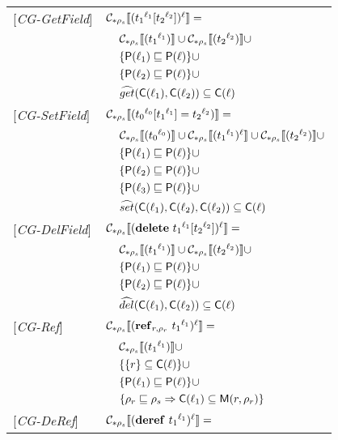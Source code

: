 \documentclass[[12pt,a4paper,twoside,openrigh]{article}
\newcommand{\lbt}[1]{{t_#1}^{\ell_#1}}
\begin{document}
\begin{tabular} {l l l l}
{[\textit{CG-GetField}]}&\multicolumn{3}{l}{$\genl {\lookup {\lbt 1} {\lbt 2}} = $}\\
&&\multicolumn{2}{l}{$ \gen {\lbt1} \cup \gen {\lbt 2} \cup$}\\
&&\multicolumn{2}{l}{$\{ \mathsf{P}(\ell_1) \sqsubseteq \mathsf{P}(\ell) \} \cup$} \\
&&\multicolumn{2}{l}{$\{ \mathsf{P}(\ell_2) \sqsubseteq \mathsf{P}(\ell) \} \cup$} \\
&&\multicolumn{2}{l}{$\widehat{get} (\mathsf{C}(\ell_1), \mathsf{C}(\ell_2)) \subseteq \mathsf{C}(\ell)$} \\
{[\textit{CG-SetField}]}&\multicolumn{3}{l}{$\gen {\store {\lbt 0} {\lbt 1} {\lbt 2}} = $}\\
&&\multicolumn{2}{l}{$ \gen {\lbt 0} \cup \genl {\lbt 1} \cup \gen {\lbt 2} \cup $}\\
&&\multicolumn{2}{l}{$\{ \mathsf{P}(\ell_1) \sqsubseteq \mathsf{P}(\ell) \} \cup$} \\
&&\multicolumn{2}{l}{$\{ \mathsf{P}(\ell_2) \sqsubseteq \mathsf{P}(\ell) \} \cup$} \\
&&\multicolumn{2}{l}{$\{ \mathsf{P}(\ell_3) \sqsubseteq \mathsf{P}(\ell) \} \cup$} \\
&&\multicolumn{2}{l}{$\widehat{set} (\mathsf{C}(\ell_1), \mathsf{C}(\ell_2), \mathsf{C}(\ell_2)) \subseteq \mathsf{C}(\ell)$} \\
{[\textit{CG-DelField}]}&\multicolumn{3}{l}{$\genl {\delete {\lbt 1} {\lbt 2}} = $}\\ 
&&\multicolumn{2}{l}{$ \gen {\lbt1} \cup \gen {\lbt 2} \cup$}\\
&&\multicolumn{2}{l}{$\{ \mathsf{P}(\ell_1) \sqsubseteq \mathsf{P}(\ell) \} \cup$} \\
&&\multicolumn{2}{l}{$\{ \mathsf{P}(\ell_2) \sqsubseteq \mathsf{P}(\ell) \} \cup$} \\
&&\multicolumn{2}{l}{$\widehat{del} (\mathsf{C}(\ell_1), \mathsf{C}(\ell_2)) \subseteq \mathsf{C}(\ell)$}\\
{[\textit{CG-Ref}]}&\multicolumn{3}{l}{$ \genl {\newref {r,\rho_r} {\lbt 1}} = $}\\
&&\multicolumn{2}{l}{$\gen {\lbt 1} \cup $}\\
&&\multicolumn{2}{l}{$\{ \{r\} \subseteq \mathsf{C}(\ell) \} \cup$}\\
&&\multicolumn{2}{l}{$\{ \mathsf{P}(\ell_1) \sqsubseteq \mathsf{P}(\ell) \} \cup$}\\
&&\multicolumn{2}{l}{$\{ \rho_r \sqsubseteq \rho_s \Rightarrow \mathsf{C}(\ell_1) \subseteq \mathsf{M}(r, \rho_r) \} $}\\
{[\textit{CG-DeRef}]}&\multicolumn{3}{l}{$\genl {\deref {\lbt 1}} = $}\\

\end{tabular}
\end{document}
